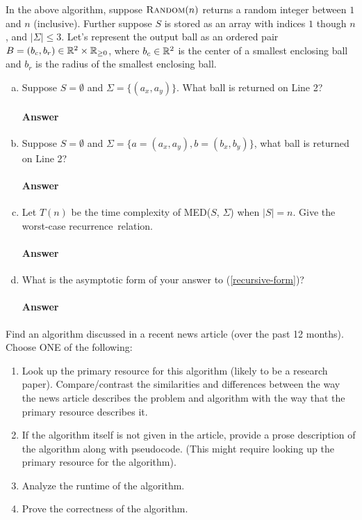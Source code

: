 \documentclass{article}
\begin{document}
In the above algorithm, suppose $\textsc{Random}(n)$ returns a random integer
between $1$ and $n$ (inclusive).  Further suppose
$S$ is stored as an array with indices $1$ though $n$,
and $|\Sigma| \leq 3$.  Let's represent the output ball as an ordered
pair~$B=(b_c,b_r) \in {\mathbb R}^2 \times {\mathbb R}_{\geq 0}$,
where $b_c\in {\mathbb R}^2$ is the center of a smallest enclosing ball and $b_r$ is the
radius of the smallest enclosing ball.

\begin{enumerate}[(a)]
    \item
        Suppose $S=\emptyset$ and $\Sigma=\{ (a_x,a_y)\}$. What ball is returned on Line 2?
        \paragraph{Answer}
    \item
        Suppose $S=\emptyset$ and $\Sigma=\{ a=(a_x,a_y),b=(b_x,b_y)\}$, what ball is returned on Line 2?
        \paragraph{Answer}

    \item Let $T(n)$ be the time complexity of MED($S$, $\Sigma$) when
        $|S|=n$.  Give the worst-case recurrence~relation.\label{recursive-form}
        \paragraph{Answer}
    \item What is the asymptotic form of your answer to (\ref{recursive-form})?
        \paragraph{Answer}
\end{enumerate}


\collab{\todo{}}

Find an algorithm discussed in a recent news article (over the past 12 months).
Choose ONE of the following:
\begin{enumerate}
    \item Look up the primary resource for this algorithm (likely to be a
        research paper).  Compare/contrast the similarities and differences between the
        way the news article describes the problem and algorithm with the way
        that the primary resource describes it.
    \item If the algorithm itself is not given in the article, provide a prose
        description of the algorithm along with pseudocode. (This might require
        looking up the primary resource for the algorithm).
    \item Analyze the runtime of the algorithm.
    \item Prove the correctness of the algorithm.
\end{enumerate}
\end{document}
